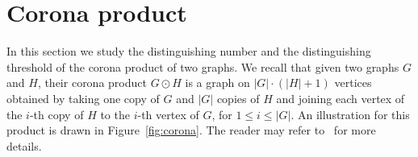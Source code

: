 \documentclass[12pt,a4paper, longbibliography]{article}
\theoremstyle{definition}
\numberwithin{equation}{section}
\begin{document}
	


	
	\section{Corona product}\label{corona}
	
	In this section we study the distinguishing number and the distinguishing threshold of the  corona product  of two graphs. We recall that given two graphs $G$  and  $H$, their corona product $G\odot H$ is a graph on $\vert G\vert\cdot \left(\vert H \vert+1\right)$ vertices obtained by taking one copy of $G$ and $\vert G\vert$ copies of $H$ and joining each vertex of the $i$-th copy of $H$ to the $i$-th vertex of $G$, for $1\leq i \leq \vert G\vert$. An illustration for this product is drawn in Figure~\ref{fig:corona}. The reader may refer to~\cite{HIK2011} for more details.
	
\end{document}
